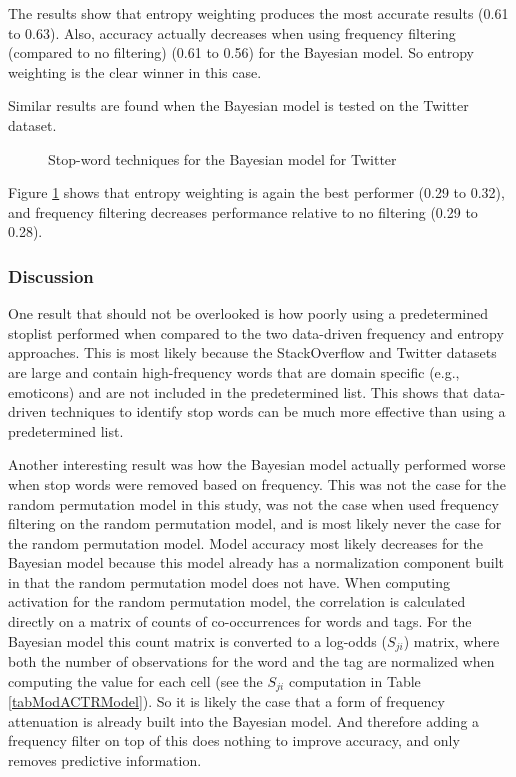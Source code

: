 \documentclass[man,floatsintext,donotrepeattitle]{apa6}
\begin{document}
The results show that entropy weighting produces the most accurate results (\num{.61} to \num{.63}).
Also, accuracy actually decreases when using frequency filtering (compared to no filtering) (\num{.61} to \num{.56}) for the Bayesian model.
So entropy weighting is the clear winner in this case.

Similar results are found when the Bayesian model is tested on the Twitter dataset.

\begin{figure}[!htbp]
  \caption{Stop-word techniques for the Bayesian model for Twitter}
  \label{figContextStopBT}
\end{figure}

Figure \ref{figContextStopBT} shows that entropy weighting is again the best performer (\num{.29} to \num{.32}), and frequency filtering decreases performance relative to no filtering (\num{.29} to \num{.28}).

\subsubsection{Discussion}

One result that should not be overlooked is how poorly using a predetermined stoplist performed when compared to the two data-driven frequency and entropy approaches.
This is most likely because the StackOverflow and Twitter datasets are large and contain high-frequency words that are domain specific (e.g., emoticons) and are not included in the predetermined list.
This shows that data-driven techniques to identify stop words can be much more effective than using a predetermined list.

Another interesting result was how the Bayesian model actually performed worse when stop words were removed based on frequency.
This was not the case for the random permutation model in this study, was not the case when \textcite{Sahlgren2008} used frequency filtering on the random permutation model,
and is most likely never the case for the random permutation model.
Model accuracy most likely decreases for the Bayesian model because this model already has a normalization component built in that the random permutation model does not have.
When computing activation for the random permutation model, the correlation is calculated directly on a matrix of counts of co-occurrences for words and tags.
For the Bayesian model this count matrix is converted to a log-odds ($S_{ji}$) matrix,
where both the number of observations for the word and the tag are normalized when computing the value for each cell (see the $S_{ji}$ computation in Table \ref{tabModACTRModel}).
So it is likely the case that a form of frequency attenuation is already built into the Bayesian model.
And therefore adding a frequency filter on top of this does nothing to improve accuracy, and only removes predictive information.
\end{document}
